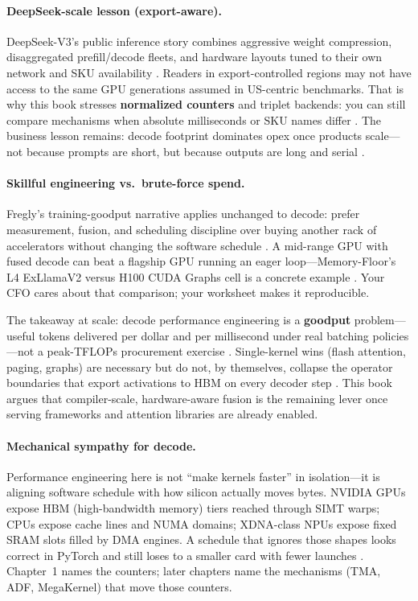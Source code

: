 \paragraph{DeepSeek-scale lesson (export-aware).}
DeepSeek-V3's public inference story combines aggressive weight compression, disaggregated prefill/decode fleets, and hardware layouts tuned to their own network and SKU availability \citep{patel2025llminference}.
Readers in export-controlled regions may not have access to the same GPU generations assumed in US-centric benchmarks.
That is why this book stresses \textbf{normalized counters} and triplet backends: you can still compare mechanisms when absolute milliseconds or SKU names differ \citep{wang2025pdacca541tokenssll,yirage2026}.
The business lesson remains: decode footprint dominates opex once products scale---not because prompts are short, but because outputs are long and serial \citep{li2024llminferenceservin}.

\paragraph{Skillful engineering vs.\ brute-force spend.}
Fregly's training-goodput narrative applies unchanged to decode: prefer measurement, fusion, and scheduling discipline over buying another rack of accelerators without changing the software schedule \citep{patel2025llminference}.
A mid-range GPU with fused decode can beat a flagship GPU running an eager loop---Memory-Floor's L4 ExLlamaV2 versus H100 CUDA Graphs cell is a concrete example \citep{memoryfloor2026}.
Your CFO cares about that comparison; your worksheet makes it reproducible.

The takeaway at scale: decode performance engineering is a \textbf{goodput} problem---useful tokens delivered per dollar and per millisecond under real batching policies---not a peak-TFLOPs procurement exercise \citep{recasens2025mindthememorygapun}.
Single-kernel wins (flash attention, paging, graphs) are necessary but do not, by themselves, collapse the operator boundaries that export activations to HBM on every decoder step \citep{dao2022flashattention,kwon2023vllm,taxbreak2026}.
This book argues that compiler-scale, hardware-aware fusion is the remaining lever once serving frameworks and attention libraries are already enabled.

\paragraph{Mechanical sympathy for decode.}
Performance engineering here is not ``make kernels faster'' in isolation---it is aligning software schedule with how silicon actually moves bytes.
NVIDIA GPUs expose HBM (high-bandwidth memory) tiers reached through SIMT warps; CPUs expose cache lines and NUMA domains; XDNA-class NPUs expose fixed SRAM slots filled by DMA engines.
A schedule that ignores those shapes looks correct in PyTorch and still loses to a smaller card with fewer launches \citep{memoryfloor2026,amd2024xdna,recasens2025mindthememorygapun}.
Chapter~1 names the counters; later chapters name the mechanisms (TMA, ADF, MegaKernel) that move those counters.



